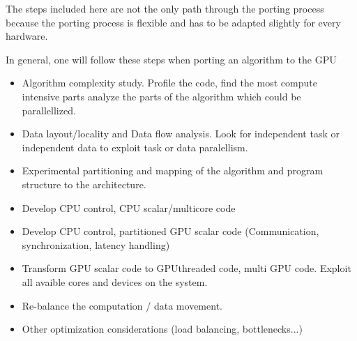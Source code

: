 The steps included here are not the only path through the porting process because
the porting process is flexible and has to be adapted slightly for every hardware. 

In general, one will follow these steps when porting an algorithm to the \gls{GPU}
\begin{itemize}
	\item Algorithm complexity study. Profile the code, find the most compute
intensive parts analyze the parts of the algorithm which could be parallellized.
	\item Data layout/locality and Data flow analysis. Look for independent task or 
	independent data to exploit task or data paralellism.
	\item Experimental partitioning and mapping of the algorithm and program 
		structure to the architecture. 
	\item Develop \gls{CPU} control, \gls{CPU} scalar/multicore code
	\item Develop \gls{CPU} control, partitioned \gls{GPU} scalar code (Communication, 
		synchronization, latency handling)
	\item Transform \gls{GPU} scalar code to \gls{GPU}threaded code, multi \gls{GPU} code. 
	Exploit all avaible cores and devices on the system. 
	\item Re-balance the computation / data movement. 
	\item Other optimization considerations (load balancing, bottlenecks...)
\end{itemize}


